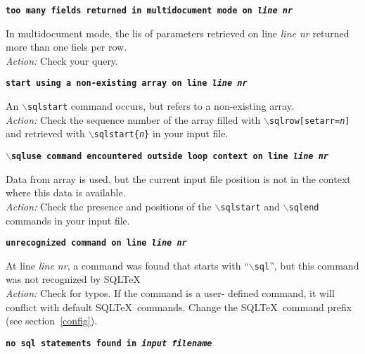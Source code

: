 \documentclass{article}
\newcommand{\bs}{\ensuremath{\backslash}}
\newcommand{\vs}{\vspace{3mm}}
\begin{document}
\vs

\noindent\textbf{\texttt{too many fields returned in multidocument mode on \textit{line nr}}}

\vspace{1mm}

\noindent In multidocument mode, the lis of parameters retrieved on line
\textit{line nr} returned more than one fiels per row. \\
\textit{Action:} Check your query.

\vs

\noindent\textbf{\texttt{start using a non-existing array on line \textit{line nr}}}

\vspace{1mm}

\noindent An \texttt{\bs sqlstart} command occurs, but refers to a non-existing array. \\
\textit{Action:} Check the sequence number of the array filled with \texttt{\bs sqlrow[setarr=\textit{n}]} and retrieved with \texttt{\bs sqlstart\{\textit{n}\}} in your input file.

\vs

\noindent\textbf{\texttt{\bs sqluse command encountered outside loop context on line \textit{line nr}}}

\vspace{1mm}

\noindent Data from array is used, but the current input file position is not in the context where this data is available.\\
\textit{Action:} Check the presence and positions of the \texttt{\bs sqlstart} and \texttt{\bs sqlend} commands in your input file.

\vs

\noindent\textbf{\texttt{unrecognized command on line \textit{line nr}}}

\vspace{1mm}

\noindent At line \textit{line nr}, a command was found that starts with ``\texttt{\bs sql}'',
but this command was not recognized by SQL\TeX\. \\
\textit{Action:} Check for typos. If the command is a user- defined command, it will
conflict with default SQL\TeX\ commands. Change the SQL\TeX\ command prefix (see section~\ref{config}).

\vs

\noindent\textbf{\texttt{no sql statements found in \textit{input filename}}}

\vspace{1mm}
\end{document}

